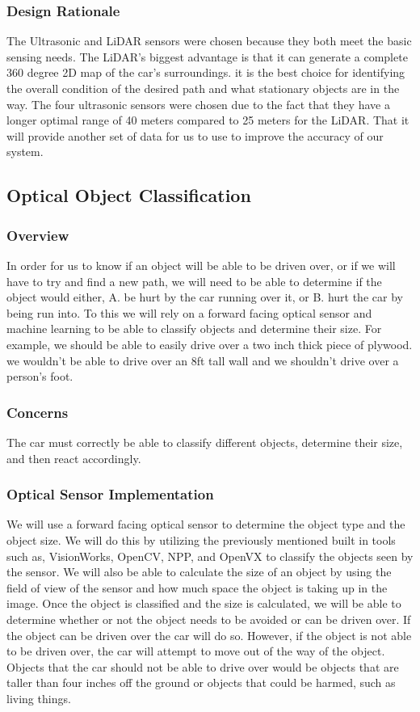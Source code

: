 \documentclass[onecolumn, draftclsnofoot, 10pt, compsoc]{IEEEtran}
\begin{document}
\subsubsection{Design Rationale}
The Ultrasonic and LiDAR sensors were chosen because they both meet the basic sensing needs. The LiDAR's biggest advantage is that it can generate a complete 360 degree 2D map of the car's surroundings. it is the best choice for identifying the overall condition of the desired path and what stationary objects are in the way. The four ultrasonic sensors were chosen due to the fact that they have a longer optimal range of 40 meters compared to 25 meters for the LiDAR. That it will provide another set of data for us to use to improve the accuracy of our system.



\subsection{Optical Object Classification}
\subsubsection{Overview}
In order for us to know if an object will be able to be driven over, or if we will have to try and find a new path, we will need to be able to determine if the object would either, A. be hurt by the car running over it, or B. hurt the car by being run into. To this we will rely on a forward facing optical sensor and machine learning to be able to classify objects and determine their size. For example, we should be able to easily drive over a two inch thick piece of plywood. we wouldn't be able to drive over an 8ft tall wall and we shouldn't drive over a person's foot.

\subsubsection{Concerns}
The car must correctly be able to classify different objects, determine their size, and then react accordingly. 

\subsubsection{Optical Sensor Implementation}
We will use a forward facing optical sensor to determine the object type and the object size. We will do this by utilizing the previously mentioned built in tools such as, VisionWorks, OpenCV, NPP, and OpenVX to classify the objects seen by the sensor. We will also be able to calculate the size of an object by using the field of view of the sensor and how much space the object is taking up in the image. Once the object is classified and the size is calculated, we will be able to determine whether or not the object needs to be avoided or can be driven over. If the object can be driven over the car will do so. However, if the object is not able to be driven over, the car will attempt to move out of the way of the object. Objects that the car should not be able to drive over would be objects that are taller than four inches off the ground or objects that could be harmed, such as living things. 
\end{document}
